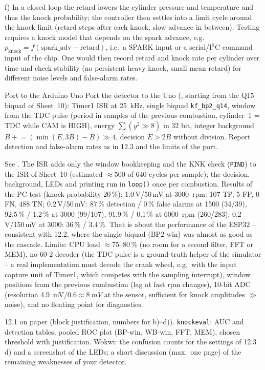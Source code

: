 \begin{solution}
f) In a closed loop the retard lowers the cylinder pressure and temperature and thus the
knock probability; the controller then settles into a limit cycle around the knock limit
(retard steps after each knock, slow advance in between). Testing requires a knock
model that depends on the spark advance, e.g.\ $p_\text{knock}=f(\text{spark\_adv}-\text{retard})$,
i.e.\ a SPARK input or a serial/I$^2$C command input of the chip. One would then record
retard and knock rate per cylinder over time and check stability (no persistent heavy
knock, small mean retard) for different noise levels and false-alarm rates.
\end{solution}

\begin{exercise}{Port to the Arduino Uno}{\Challenge}
\sloppy
Port the detector to the Uno (, starting from the Q15
biquad of Sheet~10): Timer1 ISR at \SI{25}{kHz}, single biquad \texttt{kf\_bp2\_q14},
window from the TDC pulse (period in samples of the previous combustion, cylinder~1 =
TDC while CAM is HIGH), energy $\sum (y^2\gg8)$ in 32 bit, integer background
$B\mathrel{+}=(\min(E,3B)-B)\gg4$, decision $E>2B$ without division. Report detection and
false-alarm rates as in 12.3 and the limits of the port.
\end{exercise}

\begin{solution}
See . The ISR adds only the
window bookkeeping and the KNK check (\texttt{PIND}) to the ISR of Sheet~10 (estimated
$\approx500$ of 640 cycles per sample); the decision, background, LEDs and printing run
in \texttt{loop()} once per combustion. Results of the PC test (knock probability 20\,\%):
1.0\,V/50\,mV at \SI{3000}{rpm}: 107 TP, 5 FP, 0 FN, 488 TN;
0.2\,V/50\,mV: 87\,\% detection / 0\,\% false alarms at 1500 (34/39), 92.5\,\% / 1.2\,\% at
3000 (99/107), 91.9\,\% / 0.1\,\% at \SI{6000}{rpm} (260/283);
0.2\,V/150\,mV at 3000: 36\,\% / 3.4\,\%. That is about the performance of the ESP32 --
consistent with 12.2, where the single biquad (BP2-win) was almost as good as the
cascade. Limits: CPU load $\approx75$--80\,\% (no room for a second filter, FFT or MEM),
no 60-2 decoder (the TDC pulse is a ground-truth helper of the simulator -- a real
implementation must decode the crank wheel, e.g.\ with the input capture unit of
Timer1, which competes with the sampling interrupt), window positions from the previous
combustion (lag at fast rpm changes), 10-bit ADC (resolution \SI{4.9}{mV}$/0.6\approx
\SI{8}{mV}$ at the sensor, sufficient for knock amplitudes $\gg$ noise), and no
floating point for diagnostics.
\end{solution}

\begin{deliverables}
12.1 on paper (block justification, numbers for b)--d)). \texttt{knockeval}: AUC and
detection tables, pooled ROC plot (BP-win, WB-win, FFT, MEM), chosen threshold with
justification. Wokwi: the confusion counts for the settings of 12.3\,d) and a
screenshot of the LEDs; a short discussion (max.\ one page) of the remaining weaknesses of
your detector.
\end{deliverables}
